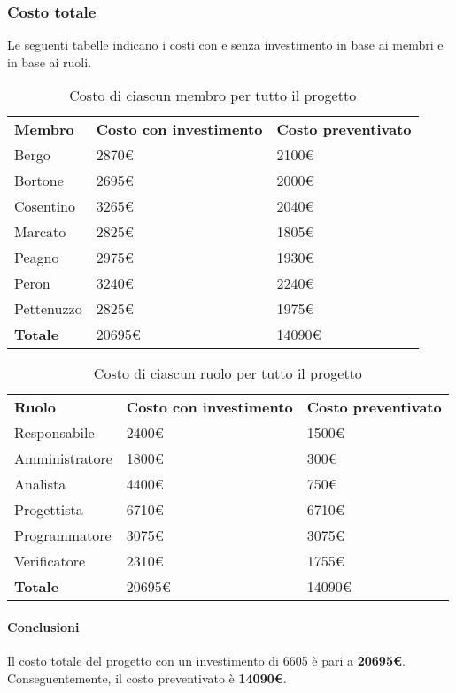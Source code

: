 	\subsubsection{Costo totale}
		Le seguenti tabelle indicano i costi con e senza investimento in base ai membri e in base ai ruoli.
		\begin{table}[h]
			\centering
			\begin{tabular}{| l | l | l |}
				\rowcolor{LightBlue}
				\textbf{\color{white}Membro}
				& \textbf{\color{white}Costo con investimento}
				& \textbf{\color{white}Costo preventivato}\\
				
				Bergo				& 2870€ & 2100€\\
				Bortone			& 2695€ & 2000€\\
				Cosentino		& 3265€ & 2040€\\
				Marcato			& 2825€ & 1805€\\
				Peagno				& 2975€ & 1930€\\
				Peron				& 3240€ & 2240€\\
				Pettenuzzo		& 2825€ & 1975€\\ \hline
				\textbf{Totale} & 20695€ & 14090€\\ \hline
			\end{tabular}
			\caption{Costo di ciascun membro per tutto il progetto}
		\end{table}
		
		\begin{table}[h]
			\centering
			\begin{tabular}{| l | l | l |}
				\rowcolor{LightBlue}
				\textbf{\color{white}Ruolo}
				& \textbf{\color{white}Costo con investimento}
				& \textbf{\color{white}Costo preventivato}\\
				
				Responsabile 		& 2400€ & 1500€\\
				Amministratore 	& 1800€ & 300€\\
				Analista 				& 4400€ & 750€\\			
				Progettista 			& 6710€ & 6710€\\
				Programmatore 		& 3075€ & 3075€\\
				Verificatore 		& 2310€ & 1755€\\ \hline
				\textbf{Totale} 	& 20695€ & 14090€\\ \hline
			\end{tabular}		
			\caption{Costo di ciascun ruolo per tutto il progetto}
		\end{table}
		
		\paragraph{Conclusioni\\}
		Il costo totale del progetto con un investimento di 6605 è pari a \textbf{20695€}. Conseguentemente, il costo preventivato è \textbf{14090€}.